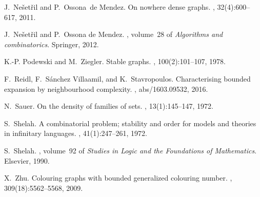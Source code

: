 \documentclass[11pt, fleqn]{article}
\theoremstyle{plain}
\theoremstyle{nonumberplain}
\begin{document}
\begin{thebibliography}{10}
J.~Ne{\v{s}}et{\v{r}}il and P.~Ossona~de Mendez.
\newblock On nowhere dense graphs.
, 32(4):600--617, 2011.

J.~Ne\v{s}et\v{r}il and P.~{Ossona de Mendez}.
,
  volume~28 of {\em Algorithms and combinatorics}.
\newblock Springer, 2012.

K.-P. Podewski and M.~Ziegler.
\newblock Stable graphs.
, 100(2):101--107, 1978.

F.~Reidl, F.~{S{\'{a}}nchez Villaamil}, and K.~Stavropoulos.
\newblock Characterising bounded expansion by neighbourhood complexity.
, abs/1603.09532, 2016.

N.~Sauer.
\newblock On the density of families of sets.
, 13(1):145--147,
  1972.

S.~Shelah.
\newblock A combinatorial problem; stability and order for models and theories
  in infinitary languages.
, 41(1):247--261, 1972.

S.~Shelah.
,
  volume~92 of {\em Studies in Logic and the Foundations of Mathematics}.
\newblock Elsevier, 1990.

X.~Zhu.
\newblock Colouring graphs with bounded generalized colouring number.
, 309(18):5562--5568, 2009.

\end{thebibliography}
\end{document}
